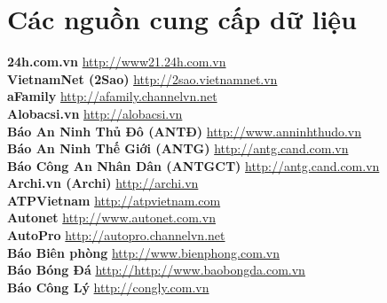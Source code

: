 \chapter{Các nguồn cung cấp dữ liệu}
\label{website}
\textbf{24h.com.vn}  \hspace{0.5in} \href{http://www21.24h.com.vn}{http://www21.24h.com.vn} \\ 
\textbf{VietnamNet (2Sao)}  \hspace{0.5in} \href{http://2sao.vietnamnet.vn}{http://2sao.vietnamnet.vn} \\ 
\textbf{aFamily}  \hspace{0.5in} \href{http://afamily.channelvn.net}{http://afamily.channelvn.net} \\ 
\textbf{Alobacsi.vn}  \hspace{0.5in} \href{http://alobacsi.vn}{http://alobacsi.vn} \\ 
\textbf{Báo An Ninh Thủ Đô (ANTĐ)}  \hspace{0.5in} \href{http://www.anninhthudo.vn}{http://www.anninhthudo.vn} \\ 
\textbf{Báo An Ninh Thế Giới (ANTG)}  \hspace{0.5in} \href{http://antg.cand.com.vn}{http://antg.cand.com.vn} \\ 
\textbf{Báo Công An Nhân Dân (ANTGCT)}  \hspace{0.5in} \href{http://antg.cand.com.vn}{http://antg.cand.com.vn} \\ 
\textbf{Archi.vn (Archi)}  \hspace{0.5in} \href{http://archi.vn}{http://archi.vn} \\ 
\textbf{ATPVietnam}  \hspace{0.5in} \href{http://atpvietnam.com}{http://atpvietnam.com} \\ 
\textbf{Autonet}  \hspace{0.5in} \href{http://www.autonet.com.vn}{http://www.autonet.com.vn} \\ 
\textbf{AutoPro}  \hspace{0.5in} \href{http://autopro.channelvn.net}{http://autopro.channelvn.net} \\ 
\textbf{Báo Biên phòng}  \hspace{0.5in} \href{http://www.bienphong.com.vn}{http://www.bienphong.com.vn} \\ 
\textbf{Báo Bóng Đá}  \hspace{0.5in} \href{http://http://www.baobongda.com.vn}{http://http://www.baobongda.com.vn} \\ 
\textbf{Báo Công Lý}  \hspace{0.5in} \href{http://congly.com.vn}{http://congly.com.vn} \\ 
